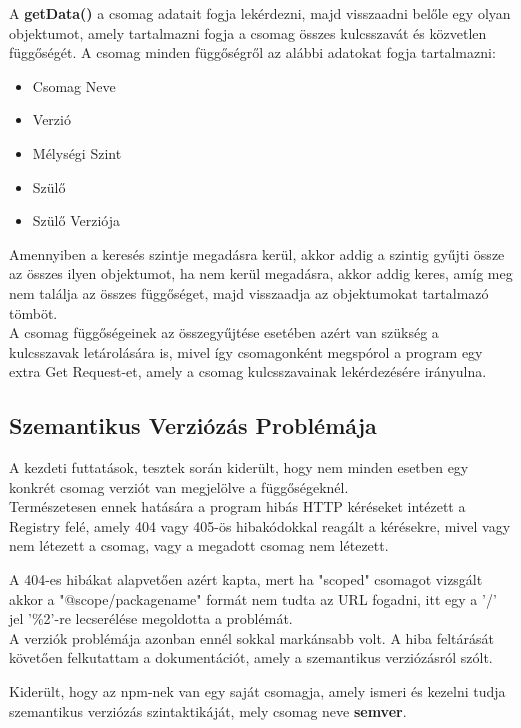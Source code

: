 \pagebreak

A \textbf{getData()} a csomag adatait fogja lekérdezni, majd visszaadni belőle egy olyan objektumot, amely tartalmazni fogja a csomag összes kulcsszavát és közvetlen függőségét. A csomag minden függőségről az alábbi adatokat fogja tartalmazni:
\begin{itemize}
	\item Csomag Neve
	\item Verzió
	\item Mélységi Szint
	\item Szülő
	\item Szülő Verziója
\end{itemize}

Amennyiben a keresés szintje megadásra kerül, akkor addig a szintig gyűjti össze az összes ilyen objektumot, ha nem kerül megadásra, akkor addig keres, amíg meg nem találja az összes függőséget, majd visszaadja az objektumokat tartalmazó tömböt.\\

A csomag függőségeinek az összegyűjtése esetében azért van szükség a kulcsszavak letárolására is, mivel így csomagonként megspórol a program egy extra Get Request-et, amely a csomag kulcsszavainak lekérdezésére irányulna.

\subsection{Szemantikus Verziózás Problémája}

A kezdeti futtatások, tesztek során kiderült, hogy nem minden esetben egy konkrét csomag verziót van megjelölve a függőségeknél.\\

Természetesen ennek hatására a program hibás HTTP kéréseket intézett a Registry felé, amely 404 vagy 405-ös hibakódokkal reagált a kérésekre, mivel vagy nem létezett a csomag, vagy a megadott csomag nem létezett. 

A 404-es hibákat alapvetően azért kapta, mert ha "scoped" csomagot vizsgált akkor a "@scope/packagename" formát nem tudta az URL fogadni, itt egy a '/' jel '\%2'-re lecserélése megoldotta a problémát.\\

A verziók problémája azonban ennél sokkal markánsabb volt. A hiba feltárását követően felkutattam a dokumentációt, amely a szemantikus verziózásról szólt. 

Kiderült, hogy az npm-nek van egy saját csomagja, amely ismeri és kezelni tudja szemantikus verziózás szintaktikáját, mely csomag neve \textbf{semver}. 

